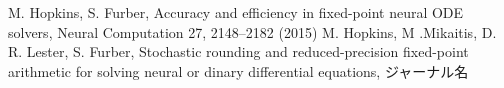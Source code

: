 \begin{thebibliography}{9}
     M. Hopkins, S. Furber, Accuracy and efficiency in fixed-point neural ODE solvers, Neural Computation 27, 2148–2182 (2015)
     M. Hopkins, M .Mikaitis, D. R. Lester, S. Furber, Stochastic rounding and reduced-precision fixed-point arithmetic for solving neural or dinary differential equations, ジャーナル名
\end{thebibliography}